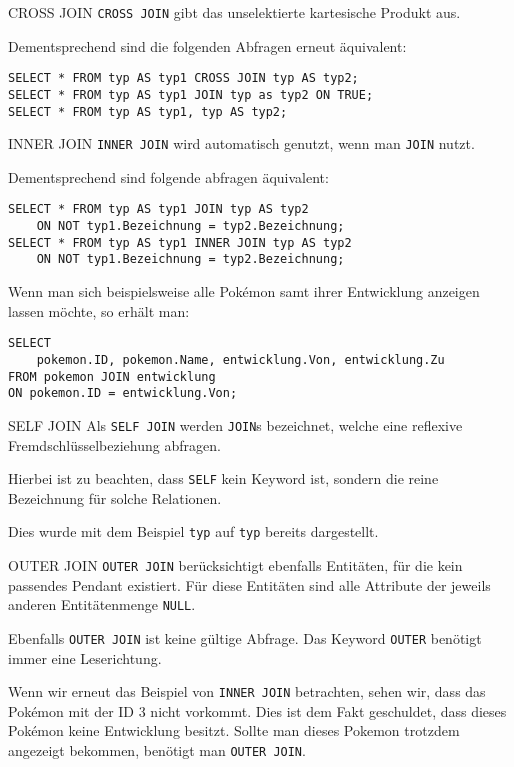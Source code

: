 \begin{sql}{CROSS JOIN}
    \texttt{CROSS JOIN} gibt das unselektierte kartesische Produkt aus.

    Dementsprechend sind die folgenden Abfragen erneut äquivalent:

    \begin{verbatim}
SELECT * FROM typ AS typ1 CROSS JOIN typ AS typ2;
SELECT * FROM typ AS typ1 JOIN typ as typ2 ON TRUE;
SELECT * FROM typ AS typ1, typ AS typ2;
    \end{verbatim}
\end{sql}

\begin{sql}{INNER JOIN}
    \texttt{INNER JOIN} wird automatisch genutzt, wenn man \texttt{JOIN} nutzt.

    Dementsprechend sind folgende abfragen äquivalent:

    \begin{verbatim}
SELECT * FROM typ AS typ1 JOIN typ AS typ2
    ON NOT typ1.Bezeichnung = typ2.Bezeichnung;
SELECT * FROM typ AS typ1 INNER JOIN typ AS typ2
    ON NOT typ1.Bezeichnung = typ2.Bezeichnung;
    \end{verbatim}

    Wenn man sich beispielsweise alle Pokémon samt ihrer Entwicklung anzeigen lassen möchte, so erhält man:

    \begin{verbatim}
SELECT
    pokemon.ID, pokemon.Name, entwicklung.Von, entwicklung.Zu
FROM pokemon JOIN entwicklung
ON pokemon.ID = entwicklung.Von;
    \end{verbatim}

    
\end{sql}

\begin{defi}{SELF JOIN}
    Als \texttt{SELF JOIN} werden \texttt{JOIN}s bezeichnet, welche eine reflexive Fremdschlüsselbeziehung abfragen.
    
    Hierbei ist zu beachten, dass \texttt{SELF} kein Keyword ist, sondern die reine Bezeichnung für solche Relationen.

    Dies wurde mit dem Beispiel \texttt{typ} auf \texttt{typ} bereits dargestellt.
\end{defi}

\begin{defi}{OUTER JOIN}
    \texttt{OUTER JOIN} berücksichtigt ebenfalls Entitäten, für die kein passendes Pendant existiert.
    Für diese Entitäten sind alle Attribute der jeweils anderen Entitätenmenge \texttt{NULL}.

    Ebenfalls \texttt{OUTER JOIN} ist keine gültige Abfrage.
    Das Keyword \texttt{OUTER} benötigt immer eine Leserichtung.

    Wenn wir erneut das Beispiel von \texttt{INNER JOIN} betrachten, sehen wir, dass das Pokémon mit der ID 3 nicht vorkommt.
    Dies ist dem Fakt geschuldet, dass dieses Pokémon keine Entwicklung besitzt.
    Sollte man dieses Pokemon trotzdem angezeigt bekommen, benötigt man \texttt{OUTER JOIN}.
\end{defi}

